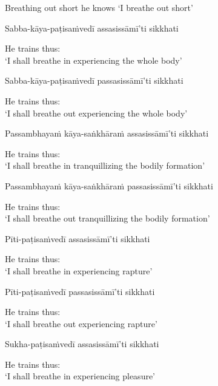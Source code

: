 \begin{cprenglish}
  Breathing out short he knows `I breathe out short'
\end{cprenglish}

Sabba-kāya-paṭisaṁvedī assasissāmī'ti sikkhati

\begin{cprenglish}
  He trains thus:\\
  `I shall breathe in experiencing the whole body'
\end{cprenglish}

Sabba-kāya-paṭisaṁvedī passasissāmī'ti sikkhati

\begin{cprenglish}
  He trains thus:\\
  `I shall breathe out experiencing the whole body'
\end{cprenglish}

Passambhayaṁ kāya-saṅkhāraṁ assasissāmī'ti sikkhati

\begin{cprenglish}
  He trains thus:\\
  `I shall breathe in tranquillizing the bodily formation'
\end{cprenglish}

Passambhayaṁ kāya-saṅkhāraṁ passasissāmī'ti sikkhati

\begin{cprenglish}
  He trains thus:\\
  `I shall breathe out tranquillizing the bodily formation'
\end{cprenglish}

Pīti-paṭisaṁvedī assasissāmī'ti sikkhati

\begin{cprenglish}
  He trains thus:\\
  `I shall breathe in experiencing rapture'
\end{cprenglish}

Pīti-paṭisaṁvedī passasissāmī'ti sikkhati

\begin{cprenglish}
  He trains thus:\\
  `I shall breathe out experiencing rapture'
\end{cprenglish}

Sukha-paṭisaṁvedī assasissāmī'ti sikkhati

\begin{cprenglish}
  He trains thus:\\
  `I shall breathe in experiencing pleasure'
\end{cprenglish}

